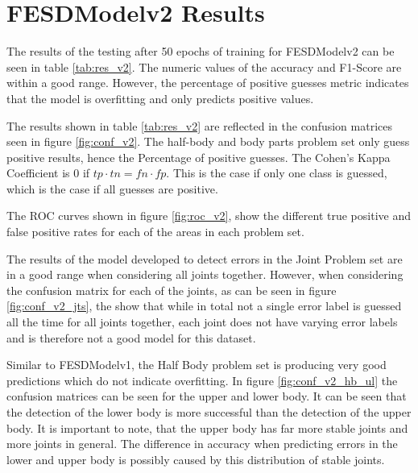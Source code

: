 \section{FESDModelv2 Results}

The results of the testing after 50 epochs of training for FESDModelv2 can be seen in table \ref{tab:res_v2}. The numeric values of the accuracy and F1-Score are within a good range. However, the percentage of positive guesses metric indicates that the model is overfitting and only predicts positive values.



The results shown in table \ref{tab:res_v2} are reflected in the confusion matrices seen in figure \ref{fig:conf_v2}. The half-body and body parts problem set only guess positive results, hence the Percentage of positive guesses. The Cohen's Kappa Coefficient is 0 if $tp \cdot tn = fn \cdot fp$. This is the case if only one class is guessed, which is the case if all guesses are positive.

The ROC curves shown in figure \ref{fig:roc_v2}, show the different true positive and false positive rates for each of the areas in each problem set.

The results of the model developed to detect errors in the Joint Problem set are in a good range when considering all joints together. However, when considering the confusion matrix for each of the joints, as can be seen in figure \ref{fig:conf_v2_jts}, the show that while in total not a single error label is guessed all the time for all joints together, each joint does not have varying error labels and is therefore not a good model for this dataset. 

Similar to FESDModelv1, the Half Body problem set is producing very good predictions which do not indicate overfitting. In figure \ref{fig:conf_v2_hb_ul} the confusion matrices can be seen for the upper and lower body. It can be seen that the detection of the lower body is more successful than the detection of the upper body. It is important to note, that the upper body has far more stable joints and more joints in general. The difference in accuracy when predicting errors in the lower and upper body is possibly caused by this distribution of stable joints.

